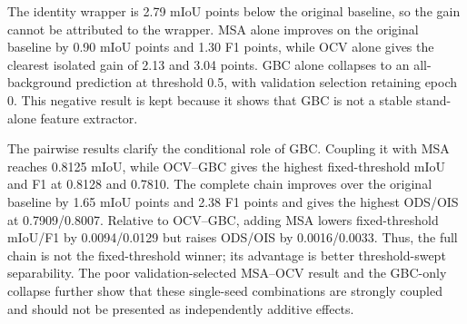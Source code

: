 \documentclass[preprint,12pt]{elsarticle}
\begin{document}
\begin{table}[H]
\centering
\caption{Complete seed-42 MSA/OCV/GBC component ablation on CrackMap. Best values are shown in bold.}
\label{tab:ablation}
\end{table}

The identity wrapper is 2.79 mIoU points below the original baseline, so the gain cannot be attributed to the wrapper. MSA alone improves on the original baseline by 0.90 mIoU points and 1.30 F1 points, while OCV alone gives the clearest isolated gain of 2.13 and 3.04 points. GBC alone collapses to an all-background prediction at threshold 0.5, with validation selection retaining epoch 0. This negative result is kept because it shows that GBC is not a stable stand-alone feature extractor.

The pairwise results clarify the conditional role of GBC. Coupling it with MSA reaches 0.8125 mIoU, while OCV--GBC gives the highest fixed-threshold mIoU and F1 at 0.8128 and 0.7810. The complete chain improves over the original baseline by 1.65 mIoU points and 2.38 F1 points and gives the highest ODS/OIS at 0.7909/0.8007. Relative to OCV--GBC, adding MSA lowers fixed-threshold mIoU/F1 by 0.0094/0.0129 but raises ODS/OIS by 0.0016/0.0033. Thus, the full chain is not the fixed-threshold winner; its advantage is better threshold-swept separability. The poor validation-selected MSA--OCV result and the GBC-only collapse further show that these single-seed combinations are strongly coupled and should not be presented as independently additive effects.
\end{document}
